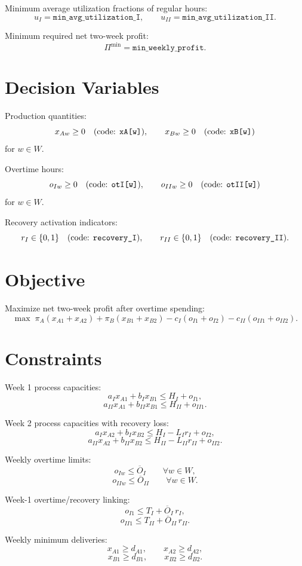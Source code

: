 Minimum average utilization fractions of regular hours:
\[
u_I=\texttt{min\_avg\_utilization\_I},\qquad
u_{II}=\texttt{min\_avg\_utilization\_II}.
\]

Minimum required net two-week profit:
\[
\Pi^{\min}=\texttt{min\_weekly\_profit}.
\]

\section*{Decision Variables}

Production quantities:
\[
x_{Aw}\ge 0 \quad \text{(code: \texttt{xA[w]})}, \qquad
x_{Bw}\ge 0 \quad \text{(code: \texttt{xB[w]})}
\]
for \(w\in W\).

Overtime hours:
\[
o_{Iw}\ge 0 \quad \text{(code: \texttt{otI[w]})}, \qquad
o_{IIw}\ge 0 \quad \text{(code: \texttt{otII[w]})}
\]
for \(w\in W\).

Recovery activation indicators:
\[
r_I\in\{0,1\}\quad \text{(code: \texttt{recovery\_I})},\qquad
r_{II}\in\{0,1\}\quad \text{(code: \texttt{recovery\_II})}.
\]

\section*{Objective}

Maximize net two-week profit after overtime spending:
\[
\max \;
\pi_A(x_{A1}+x_{A2})+\pi_B(x_{B1}+x_{B2})
-c_I(o_{I1}+o_{I2})-c_{II}(o_{II1}+o_{II2}).
\]

\section*{Constraints}

Week 1 process capacities:
\[
a_I x_{A1}+b_I x_{B1}\le H_I+o_{I1},
\]
\[
a_{II} x_{A1}+b_{II} x_{B1}\le H_{II}+o_{II1}.
\]

Week 2 process capacities with recovery loss:
\[
a_I x_{A2}+b_I x_{B2}\le H_I-L_I r_I+o_{I2},
\]
\[
a_{II} x_{A2}+b_{II} x_{B2}\le H_{II}-L_{II} r_{II}+o_{II2}.
\]

Weekly overtime limits:
\[
o_{Iw}\le \overline{O}_I \qquad \forall w\in W,
\]
\[
o_{IIw}\le \overline{O}_{II} \qquad \forall w\in W.
\]

Week-1 overtime/recovery linking:
\[
o_{I1}\le T_I+\overline{O}_I\, r_I,
\]
\[
o_{II1}\le T_{II}+\overline{O}_{II}\, r_{II}.
\]

Weekly minimum deliveries:
\[
x_{A1}\ge d_{A1},\qquad x_{A2}\ge d_{A2},
\]
\[
x_{B1}\ge d_{B1},\qquad x_{B2}\ge d_{B2}.
\]

